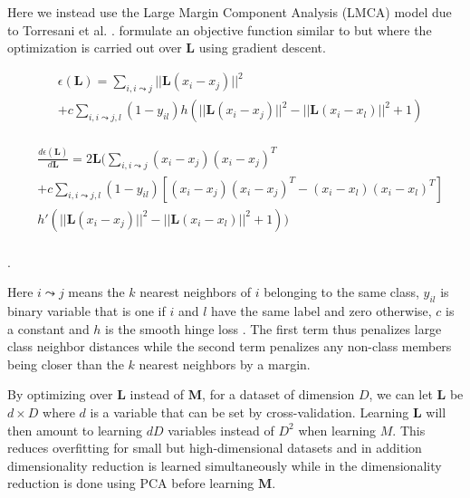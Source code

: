 Here we instead use the Large Margin Component Analysis (LMCA) model due
to Torresani et al. \cite{Torresani:2006wb}. \cite{Torresani:2006wb}
formulate an objective function similar to \cite{Weinberger:2009to} but
where the optimization is carried out over \(\mathbf{L}\) using gradient
descent.

\small 

\begin{equation}
\label{lossfun}
\begin{aligned}
& \epsilon(\mathbf{L}) = \sum\limits_{i,i \leadsto j} ||\mathbf{L} (x_i-x_j)||^{2}  \\
&  + c \sum\limits_{i,i \leadsto j,l}(1-y_{il})h(||\mathbf{L} (x_i-x_j)||^{2} - || \mathbf{L} (x_i-x_l)||^{2} +1 )  \\
\end{aligned}
\end{equation}

\begin{equation}
\label{lossfunderivative}
\begin{aligned}
& \frac{d\epsilon(\mathbf{L})}{d\mathbf{L}} = 2 \mathbf{L} ( \sum\limits_{i,i \leadsto j} (x_i-x_j)(x_i-x_j)^{T}  \\
&  + c \sum\limits_{i,i \leadsto j,l}(1-y_{il}) [(x_i-x_j)(x_i-x_j)^{T} - (x_i-x_l)(x_i-x_l)^{T} ]  \\
& h'(||\mathbf{L} (x_i-x_j)||^{2} - || \mathbf{L} (x_i-x_l)||^{2} +1 ) ) \\
\end{aligned}
\end{equation}

. \normalsize

Here \(i \leadsto j\) means the \(k\) nearest neighbors of \(i\)
belonging to the same class, \(y_{il}\) is binary variable that is one
if \(i\) and \(l\) have the same label and zero otherwise, \(c\) is a
constant and \(h\) is the smooth hinge loss \cite{Rennie:2005ds}. The
first term thus penalizes large class neighbor distances while the
second term penalizes any non-class members being closer than the \(k\)
nearest neighbors by a margin.

By optimizing over \(\mathbf{L}\) instead of \(\mathbf{M}\), for a
dataset of dimension \(D\), we can let \(\mathbf{L}\) be \(d \times D\)
where \(d\) is a variable that can be set by cross-validation. Learning
\(\mathbf{L}\) will then amount to learning \(dD\) variables instead of
\(D^2\) when learning \(M\). This reduces overfitting for small but
high-dimensional datasets and in addition dimensionality reduction is
learned simultaneously while in \cite{Weinberger:2009to} the
dimensionality reduction is done using PCA before learning
\(\mathbf{M}\).

